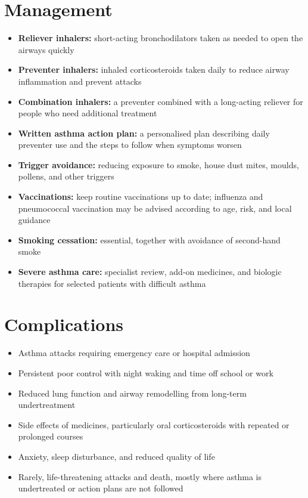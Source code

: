 \section*{Management}
\begin{itemize}
    \item \textbf{Reliever inhalers:} short-acting bronchodilators taken as needed to open the airways quickly
    \item \textbf{Preventer inhalers:} inhaled corticosteroids taken daily to reduce airway inflammation and prevent attacks
    \item \textbf{Combination inhalers:} a preventer combined with a long-acting reliever for people who need additional treatment
    \item \textbf{Written asthma action plan:} a personalised plan describing daily preventer use and the steps to follow when symptoms worsen
    \item \textbf{Trigger avoidance:} reducing exposure to smoke, house dust mites, moulds, pollens, and other triggers
    \item \textbf{Vaccinations:} keep routine vaccinations up to date; influenza and pneumococcal vaccination may be advised according to age, risk, and local guidance
    \item \textbf{Smoking cessation:} essential, together with avoidance of second-hand smoke
    \item \textbf{Severe asthma care:} specialist review, add-on medicines, and biologic therapies for selected patients with difficult asthma
\end{itemize}

\section*{Complications}
\begin{itemize}
    \item Asthma attacks requiring emergency care or hospital admission
    \item Persistent poor control with night waking and time off school or work
    \item Reduced lung function and airway remodelling from long-term undertreatment
    \item Side effects of medicines, particularly oral corticosteroids with repeated or prolonged courses
    \item Anxiety, sleep disturbance, and reduced quality of life
    \item Rarely, life-threatening attacks and death, mostly where asthma is undertreated or action plans are not followed
\end{itemize}

